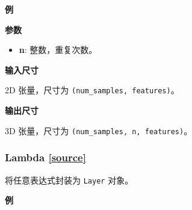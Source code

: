 \textbf{例}

\begin{Shaded}
\begin{Highlighting}[]
\OperatorTok{=} 
\OperatorTok{=}\NormalTok{))}

\NormalTok{))}
\end{Highlighting}
\end{Shaded}

\textbf{参数}

\begin{itemize}
\tightlist
\item
  \textbf{n}: 整数，重复次数。
\end{itemize}

\textbf{输入尺寸}

2D 张量，尺寸为 \texttt{(num\_samples,\ features)}。

\textbf{输出尺寸}

3D 张量，尺寸为 \texttt{(num\_samples,\ n,\ features)}。

\subsubsection{Lambda {\href{https://github.com/keras-team/keras/blob/master/keras/layers/core.py\#L542}{{[}source{]}}}}

\begin{Shaded}
\begin{Highlighting}[]
\OperatorTok{=}\OperatorTok{=}\OperatorTok{=}\NormalTok{)}
\end{Highlighting}
\end{Shaded}

将任意表达式封装为 \texttt{Layer} 对象。

\textbf{例}

\begin{Shaded}
\begin{Highlighting}[]
 \OperatorTok{**} \NormalTok{))}
\end{Highlighting}
\end{Shaded}

